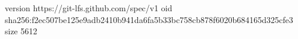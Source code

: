 version https://git-lfs.github.com/spec/v1
oid sha256:f2ec507be125e9adb2410b941da6fa5b33bc758cb878f6020b684165d325cfe3
size 5612
